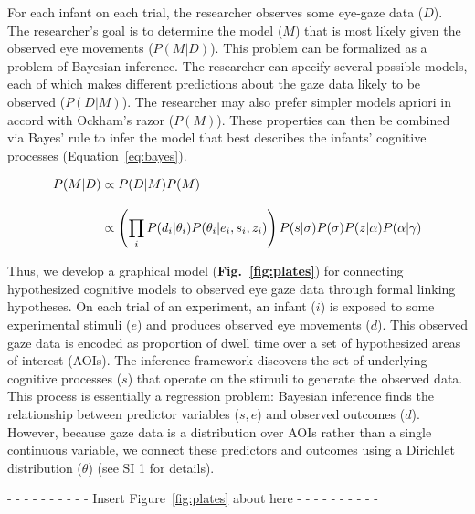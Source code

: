 \documentclass[12pt]{article}
\begin{document}
	For each infant on each trial, the researcher observes some eye-gaze data ($D$). The researcher’s goal is to determine the model ($M$) that is most likely given the observed eye movements ($P(M|D)$). This problem can be formalized as a problem of Bayesian inference. The researcher can specify several possible models, each of which makes different predictions about the gaze data likely to be observed ($P(D|M)$). The researcher may also prefer simpler models apriori in accord with Ockham’s razor ($P(M)$). These properties can then be combined via Bayes’ rule to infer the model that best describes the infants’ cognitive processes (Equation~\ref{eq:bayes}).

\begin{equation}\label{eq:bayes}
\setlength{\jot}{12pt}
\begin{aligned} 
P(M|D) &\propto P(D|M)P(M)\\
&\propto \left(\prod_{i}P(d_{i}|\theta_{i})P(\theta_{i}|e_{i},s_{i},z_{i})\right)P(s|\sigma)P(\sigma)P(z|\alpha)P(\alpha|\gamma)
\end{aligned}
\end{equation}

	Thus, we develop a graphical model (\textbf{Fig.~\ref{fig:plates}}) for connecting hypothesized cognitive models to observed eye gaze data through formal linking hypotheses. On each trial of an experiment, an infant ($i$) is exposed to some experimental stimuli ($e$) and produces observed eye movements ($d$). This observed gaze data is encoded as proportion of dwell time over a set of hypothesized areas of interest (AOIs). The inference framework discovers the set of underlying cognitive processes ($s$) that operate on the stimuli to generate the observed data. This process is essentially a regression problem: Bayesian inference finds the relationship between predictor variables ($s,e$) and observed outcomes ($d$). However, because gaze data is a distribution over AOIs rather than a single continuous variable, we connect these predictors and outcomes using a Dirichlet distribution ($\theta$) (see SI 1 for details).

\begin{center}- - - - - - - - - - Insert Figure~\ref{fig:plates} about here - - - - - - - - - -\end{center}
\end{document}
